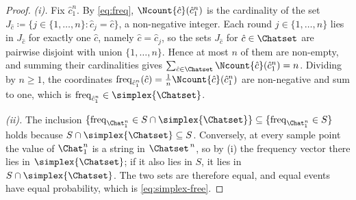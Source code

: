 \begin{proof}
\emph{(i).} Fix $\hat c_1^n$. By \eqref{eq:freq},
$\Ncount{\hat c}(\hat c_1^n)$ is the cardinality of the set
$J_{\hat c}\coloneqq\{j\in\{1,\dots,n\}:\hat c_j=\hat c\}$, a non-negative
integer. Each round $j\in\{1,\dots,n\}$ lies in $J_{\hat c}$ for exactly one
$\hat c$, namely $\hat c=\hat c_j$, so the sets $J_{\hat c}$ for
$\hat c\in\Chatset$ are pairwise disjoint with union $\{1,\dots,n\}$. Hence
at most $n$ of them are non-empty, and summing their cardinalities gives
$\sum_{\hat c\in\Chatset}\Ncount{\hat c}(\hat c_1^n)=n$. Dividing by $n\ge1$,
the coordinates $\operatorname{freq}_{\hat c_1^n}(\hat c)
=\tfrac1n\Ncount{\hat c}(\hat c_1^n)$ are non-negative and sum to one, which
is $\operatorname{freq}_{\hat c_1^n}\in\simplex{\Chatset}$.

\emph{(ii).} The inclusion
$\{\operatorname{freq}_{\Chat_1^n}\in S\cap\simplex{\Chatset}\}
\subseteq\{\operatorname{freq}_{\Chat_1^n}\in S\}$ holds because
$S\cap\simplex{\Chatset}\subseteq S$. Conversely, at every sample point the
value of $\Chat_1^n$ is a string in $\Chatset^{\,n}$, so by (i) the frequency
vector there lies in $\simplex{\Chatset}$; if it also lies in $S$, it lies in
$S\cap\simplex{\Chatset}$. The two sets are therefore equal, and equal events
have equal probability, which is \eqref{eq:simplex-free}.
\end{proof}
